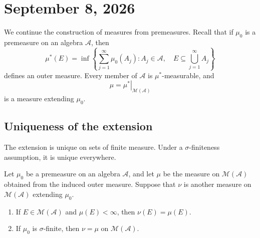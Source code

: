 \section{September 8, 2026}

We continue the construction of measures from premeasures. Recall that
if $\mu_0$ is a premeasure on an algebra $\mathcal A$, then
\[
  \mu^*(E)
  =\inf\left\{
    \sum_{j=1}^{\infty}\mu_0(A_j):
    A_j\in\mathcal A,\quad
    E\subseteq\bigcup_{j=1}^{\infty}A_j
  \right\}
\]
defines an outer measure. Every member of $\mathcal A$ is
$\mu^*$-measurable, and
\[
  \mu=\left.\mu^*\right|_{\mathcal M(\mathcal A)}
\]
is a measure extending $\mu_0$.

\subsection{Uniqueness of the extension}

The extension is unique on sets of finite measure. Under a
$\sigma$-finiteness assumption, it is unique everywhere.

\begin{theorem}
  \label{thm:uniqueness-premeasure-extension}
  Let $\mu_0$ be a premeasure on an algebra $\mathcal A$, and let
  $\mu$ be the measure on $\mathcal M(\mathcal A)$ obtained from the
  induced outer measure. Suppose that $\nu$ is another measure on
  $\mathcal M(\mathcal A)$ extending $\mu_0$.
  \begin{enumerate}[label=(\alph*)]
    \item If $E\in\mathcal M(\mathcal A)$ and $\mu(E)<\infty$, then
      $\nu(E)=\mu(E)$.
    \item If $\mu_0$ is $\sigma$-finite, then $\nu=\mu$ on
      $\mathcal M(\mathcal A)$.
  \end{enumerate}
\end{theorem}

